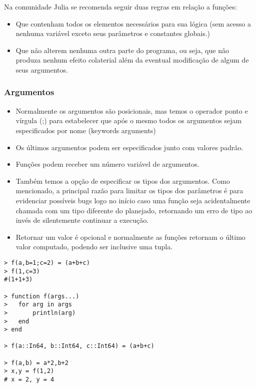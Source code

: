 Na comunidade Julia se recomenda seguir duas regras em relação a funções:%
\begin{itemize}
    \item Que contenham todos os elementos necessários para sua lógica (sem acesso a nenhuma variável exceto seus parâmetros e constantes globais.)
    \item Que não alterem nenhuma outra parte do programa, ou seja, que não produza nenhum efeito colaterial além da eventual modificação de algum de seus argumentos. 
\end{itemize}

\subsubsection{Argumentos}
\begin{itemize} %
    \item Normalmente os argumentos são posicionais, mas temos o operador ponto e vírgula (;) para estabelecer que após o mesmo todos os argumentos sejam especificados por nome (keywords arguments)
    \item Os últimos argumentos podem ser especificados junto com valores padrão.
    \item Funções podem receber um número variável de argumentos. 
    \item Também temos a opção de especificar os tipos dos argumentos. Como mencionado, a principal razão para limitar os tipos dos parâmetros é para evidenciar possíveis bugs logo no início caso uma função seja acidentalmente chamada com um tipo diferente do planejado, retornando um erro de tipo ao invés de silentemente continuar a execução.
    \item Retornar um valor é opcional e normalmente as funções retornam o último valor computado, podendo ser inclusive uma tupla.
\end{itemize}
\begin{lstlisting}
> f(a,b=1;c=2) = (a+b+c) 
> f(1,c=3) 
#(1+1+3)

> function f(args...)
> 	for arg in args
> 		println(arg)
> 	end
> end

> f(a::In64, b::Int64, c::Int64) = (a+b+c)

> f(a,b) = a*2,b+2
> x,y = f(1,2) 
# x = 2, y = 4
    
\end{lstlisting}

